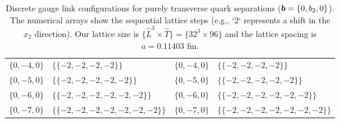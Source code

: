 \begin{table}[tb]
\begin{ruledtabular}
\begin{tabular}{llll}
$\{0,-4,0\}$ & \parbox[t]{0.32\textwidth}{\raggedright $\{$\mbox{$\{-2,-2,-2,-2\}$}$\}$} & $\{0,-4,0\}$ & \parbox[t]{0.32\textwidth}{\raggedright $\{$\mbox{$\{-2,-2,-2,-2\}$}$\}$} \\
$\{0,-5,0\}$ & \parbox[t]{0.32\textwidth}{\raggedright $\{$\mbox{$\{-2,-2,-2,-2,-2\}$}$\}$} & $\{0,-5,0\}$ & \parbox[t]{0.32\textwidth}{\raggedright $\{$\mbox{$\{-2,-2,-2,-2,-2\}$}$\}$} \\
$\{0,-6,0\}$ & \parbox[t]{0.32\textwidth}{\raggedright $\{$\mbox{$\{-2,-2,-2,-2,-2,-2\}$}$\}$} & $\{0,-6,0\}$ & \parbox[t]{0.32\textwidth}{\raggedright $\{$\mbox{$\{-2,-2,-2,-2,-2,-2\}$}$\}$} \\
$\{0,-7,0\}$ & \parbox[t]{0.32\textwidth}{\raggedright $\{$\mbox{$\{-2,-2,-2,-2,-2,-2,-2\}$}$\}$} & $\{0,-7,0\}$ & \parbox[t]{0.32\textwidth}{\raggedright $\{$\mbox{$\{-2,-2,-2,-2,-2,-2,-2\}$}$\}$} \\
\end{tabular}
\end{ruledtabular}
    \caption{Discrete gauge link configurations for purely transverse quark separations ($\boldsymbol{b} = \{0, b_2, 0\}$). The numerical arrays show the sequential lattice steps (e.g., `2` represents a shift in the $x_2$ direction). Our lattice size is $\{\hat{L}^3\times\hat{T}\}=\{32^3\times96\}$ and the lattice spacing is $a=0.11403\text{ fm}$.}
    \label{tab:b_table_transverse}
\end{table}

